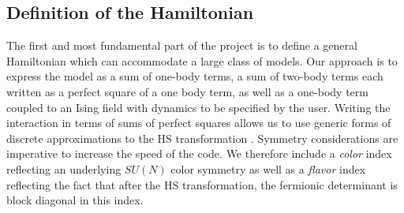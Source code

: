 \subsection{Definition of the Hamiltonian}

The first and most fundamental part of the project  is to define a general Hamiltonian which  can  accommodate a large class of models. 
Our approach is to express the model as a sum of one-body terms, a sum of two-body terms each written as a perfect square of a one body term, as well as a one-body term coupled to an Ising field with  dynamics to be specified by the user. 
Writing the interaction in terms of sums of perfect squares allows us to use generic forms of  discrete  approximations to the  HS  transformation \cite{Motome97,Assaad97}.
Symmetry considerations  are  imperative to increase the speed of the code.  
We therefore include a \emph{color} index  reflecting  an underlying  $SU(N)$ color symmetry as  well as a \emph{flavor} index  reflecting  the fact that  after  the HS  transformation,  the  fermionic determinant is block diagonal in this index.

